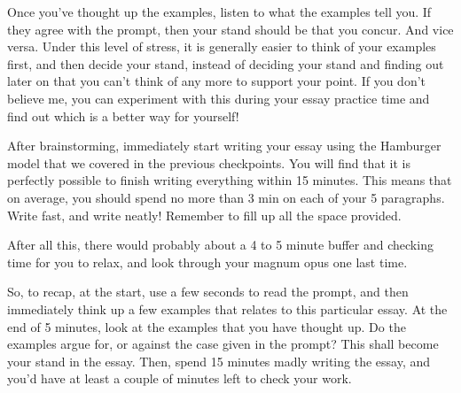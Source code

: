 \documentclass[DIV=calc,11pt,parskip,numbers=noenddot]{scrartcl} %
\begin{document}
Once you’ve thought up the examples, listen to what the examples tell you. If they agree with the prompt, then your stand should be that you concur. And vice versa. Under this level of stress, it is generally easier to think of your examples first, and then decide your stand, instead of deciding your stand and finding out later on that you can’t think of any more to support your point. If you don’t believe me, you can experiment with this during your essay practice time and find out which is a better way for yourself!

After brainstorming, immediately start writing your essay using the Hamburger model that we covered in the previous checkpoints. You will find that it is perfectly possible to finish writing everything within 15 minutes. This means that on average, you should spend no more than 3 min on each of your 5 paragraphs. Write fast, and write neatly! Remember to fill up all the space provided.

After all this, there would probably about a 4 to 5 minute buffer and checking time for you to relax, and look through your magnum opus one last time.

So, to recap, at the start, use a few seconds to read the prompt, and then immediately think up a few examples that relates to this particular essay. At the end of 5 minutes, look at the examples that you have thought up. Do the examples argue for, or against the case given in the prompt? This shall become your stand in the essay. Then, spend 15 minutes madly writing the essay, and you’d have at least a couple of minutes left to check your work.
\end{document}
